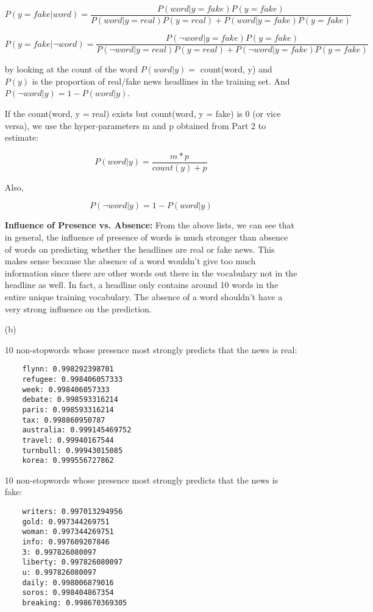 \documentclass{article}
\begin{document}
\begin{enumerate}
$$P(y = fake|word) = \frac{P(word|y = fake)P(y = fake)}{P(word|y = real)P(y = real)+P(word|y = fake)P(y = fake)}$$

$$P(y = fake|\neg word) = \frac{P(\neg word|y = fake)P(y = fake)}{P(\neg word|y = real)P(y = real)+P(\neg word|y = fake)P(y = fake)}$$

by looking at the count of the word $P(word|y) =$ count(word, y) and $P(y)$ is the proportion of real/fake news headlines in the training set. And $P(\neg word|y) = 1- P(word|y)$.

If the count(word, y = real) exists but count(word, y = fake) is 0 (or vice versa), we use the hyper-parameters m and p obtained from Part 2 to estimate: 

$$P(word|y) = \frac{m*p}{count(y)+p}$$

Also,

$$P(\neg word| y) = 1 - P(word| y)$$

\textbf{Influence of Presence vs. Absence:}
From the above lists, we can see that in general, the influence of presence of words is much stronger than absence of words on predicting whether the headlines are real or fake news. This makes sense because the absence of a word wouldn't give too much information since there are other words out there in the vocabulary not in the headline as well. In fact, a headline only contains around 10 words in the entire unique training vocabulary. The absence of a word shouldn't have a very strong influence on the prediction.

\item[(b)]

10 non-stopwords whose presence most strongly predicts that the news is real:
\begin{verbatim}
    flynn: 0.998292398701
    refugee: 0.998406057333
    week: 0.998406057333
    debate: 0.998593316214
    paris: 0.998593316214
    tax: 0.998860950787
    australia: 0.999145469752
    travel: 0.99940167544
    turnbull: 0.99943015085
    korea: 0.999556727862
\end{verbatim}

10 non-stopwords whose presence most strongly predicts that the news is fake:
\begin{verbatim}
    writers: 0.997013294956
    gold: 0.997344269751
    woman: 0.997344269751
    info: 0.997609207846
    3: 0.997826080097
    liberty: 0.997826080097
    u: 0.997826080097
    daily: 0.998006879016
    soros: 0.998404867354
    breaking: 0.998670369305
\end{verbatim}



\end{enumerate}
\end{document}
